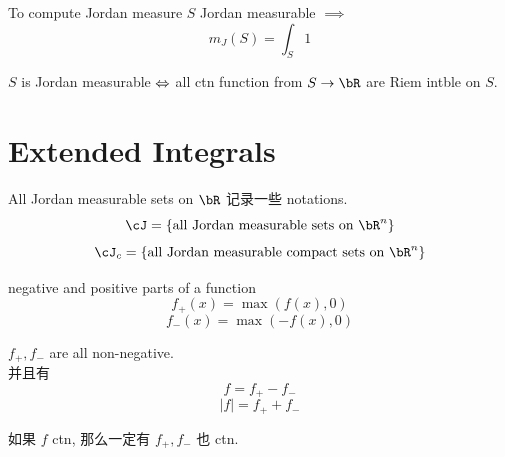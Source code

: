 \begin{corollary}{To compute Jordan measure}
    $S$ Jordan measurable $\implies$ 
    $$
    m_J (S) = \int_S 1 
    $$
\end{corollary}



\begin{corollary}
    $S$ is Jordan measurable $\Leftrightarrow$ all ctn function from $S \rar \bR$ are Riem intble on $S$.
\end{corollary}




\section{Extended Integrals}
\begin{definition}{All Jordan measurable sets on $\bR$}
    记录一些 notations.\\
    $$
    \cJ = \{ \text{all Jordan measurable sets on } \bR^n \}
    $$
    $$
    \cJ_c = \{ \text{all Jordan measurable compact sets on } \bR^n \}
    $$
\end{definition}


\begin{definition}{negative and positive parts of a function}
    $$
    f_+ (x) = \max(f(x), 0)
    $$
    $$
    f_- (x) = \max(-f(x), 0)
    $$
\end{definition}

\begin{note}
    $f_+, f_-$ are all non-negative.\\
    并且有
    $$
    f = f_+ - f_-
    $$
    $$
    |f| = f_+ + f_-
    $$
\end{note}


\begin{remark}
    如果 $f$ ctn, 那么一定有 $f_+, f_-$ 也 ctn.
\end{remark}


